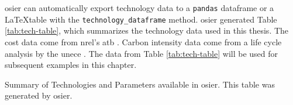 \ac{osier} can automatically export technology data to a \texttt{pandas}
dataframe or a \LaTeX table with the
\texttt{technology\_dataframe} method. \ac{osier} generated Table \ref{tab:tech-table}, which summarizes the
technology data used in this thesis. The cost data come from \ac{nrel}'s
\ac{atb} \cite{national_renewable_energy_laboratory_2023_2023}. Carbon intensity
data come from a life cycle analysis by the \ac{unece}
\cite{united_nations_economic_commission_for_europe_carbon_2022}. The data from
Table \ref{tab:tech-table} will be used for subsequent examples in this chapter.

\begin{sidewaystable}[!ht]
  \centering
  \caption{Summary of Technologies and Parameters available in \ac{osier}. This
  table was generated by \ac{osier}.}
  \label{tab:tech-table}
  \resizebox{\textheight}{!}{
  
  } %
\end{sidewaystable}

\FloatBarrier